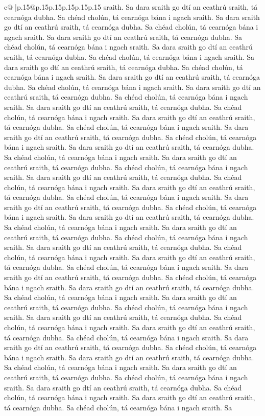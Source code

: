 \documentclass{article}
\begin{document}
{\begin{supertabular}{c@{$\;$}|p{.15\linewidth}@{}p{.15\linewidth}p{.15\linewidth}p{.15\linewidth}p{.15\linewidth}p{.15\linewidth}}
{{{sraith. Sa dara sraith go dtí an ceathrú sraith, tá cearnóga dubha. Sa chéad cholún, tá cearnóga bána i ngach sraith. Sa dara sraith go dtí an ceathrú sraith, tá cearnóga dubha. Sa chéad cholún, tá cearnóga bána i ngach sraith. Sa dara sraith go dtí an ceathrú sraith, tá cearnóga dubha. Sa chéad cholún, tá cearnóga bána i ngach sraith. Sa dara sraith go dtí an ceathrú sraith, tá cearnóga dubha. Sa chéad cholún, tá cearnóga bána i ngach sraith. Sa dara sraith go dtí an ceathrú sraith, tá cearnóga dubha. Sa chéad cholún, tá cearnóga bána i ngach sraith. Sa dara sraith go dtí an ceathrú sraith, tá cearnóga dubha. Sa chéad cholún, tá cearnóga bána i ngach sraith. Sa dara sraith go dtí an ceathrú sraith, tá cearnóga dubha. Sa chéad cholún, tá cearnóga bána i ngach sraith. Sa dara sraith go dtí an ceathrú sraith, tá cearnóga dubha. Sa chéad cholún, tá cearnóga bána i ngach sraith. Sa dara sraith go dtí an ceathrú sraith, tá cearnóga dubha. Sa chéad cholún, tá cearnóga bána i ngach sraith. Sa dara sraith go dtí an ceathrú sraith, tá cearnóga dubha. Sa chéad cholún, tá cearnóga bána i ngach sraith. Sa dara sraith go dtí an ceathrú sraith, tá cearnóga dubha. Sa chéad cholún, tá cearnóga bána i ngach sraith. Sa dara sraith go dtí an ceathrú sraith, tá cearnóga dubha. Sa chéad cholún, tá cearnóga bána i ngach sraith. Sa dara sraith go dtí an ceathrú sraith, tá cearnóga dubha. Sa chéad cholún, tá cearnóga bána i ngach sraith. Sa dara sraith go dtí an ceathrú sraith, tá cearnóga dubha. Sa chéad cholún, tá cearnóga bána i ngach sraith. Sa dara sraith go dtí an ceathrú sraith, tá cearnóga dubha. Sa chéad cholún, tá cearnóga bána i ngach sraith. Sa dara sraith go dtí an ceathrú sraith, tá cearnóga dubha. Sa chéad cholún, tá cearnóga bána i ngach sraith. Sa dara sraith go dtí an ceathrú sraith, tá cearnóga dubha. Sa chéad cholún, tá cearnóga bána i ngach sraith. Sa dara sraith go dtí an ceathrú sraith, tá cearnóga dubha. Sa chéad cholún, tá cearnóga bána i ngach sraith. Sa dara sraith go dtí an ceathrú sraith, tá cearnóga dubha. Sa chéad cholún, tá cearnóga bána i ngach sraith. Sa dara sraith go dtí an ceathrú sraith, tá cearnóga dubha. Sa chéad cholún, tá cearnóga bána i ngach sraith. Sa dara sraith go dtí an ceathrú sraith, tá cearnóga dubha. Sa chéad cholún, tá cearnóga bána i ngach sraith. Sa dara sraith go dtí an ceathrú sraith, tá cearnóga dubha. Sa chéad cholún, tá cearnóga bána i ngach sraith. Sa dara sraith go dtí an ceathrú sraith, tá cearnóga dubha. Sa chéad cholún, tá cearnóga bána i ngach sraith. Sa dara sraith go dtí an ceathrú sraith, tá cearnóga dubha. Sa chéad cholún, tá cearnóga bána i ngach sraith. Sa dara sraith go dtí an ceathrú sraith, tá cearnóga dubha. Sa chéad cholún, tá cearnóga bána i ngach sraith. Sa dara sraith go dtí an ceathrú sraith, tá cearnóga dubha. Sa chéad cholún, tá cearnóga bána i ngach sraith. Sa dara sraith go dtí an ceathrú sraith, tá cearnóga dubha. Sa chéad cholún, tá cearnóga bána i ngach sraith. Sa dara sraith go dtí an ceathrú sraith, tá cearnóga dubha. Sa chéad cholún, tá cearnóga bána i ngach sraith. Sa dara sraith go dtí an ceathrú sraith, tá cearnóga dubha. Sa chéad cholún, tá cearnóga bána i ngach sraith. Sa }}}
\end{supertabular}}
\end{document}
